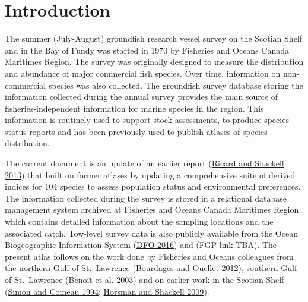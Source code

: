 \documentclass[12pt]{article}\usepackage[]{graphicx}\usepackage[]{color}
\begin{document}

\frontmatter


\renewcommand{\headrulewidth}{0.5pt}  %
\renewcommand{\footrulewidth}{0.5pt}  %

\newcommand{\lt}{\ensuremath <}
\newcommand{\gt}{\ensuremath >}

\newlength{\cslhangindent}
\setlength{\cslhangindent}{1.5em}
\newenvironment{cslreferences}%
  {}%
  {\par}

\hypertarget{sec:introduction}{%
\section{Introduction}\label{sec:introduction}}

The summer (July-August) groundfish research vessel survey on the Scotian Shelf and in the Bay of Fundy was started in 1970 by Fisheries and Oceans Canada Maritimes Region. The survey was originally designed to measure the distribution and abundance of major commercial fish species. Over time, information on non-commercial species was also collected. The groundfish survey database storing the information collected during the annual survey provides the main source of fisheries-independent information for marine species in the region. This information is routinely used to support stock assessments, to produce species status reports and has been previously used to publish atlases of species distribution.

The current document is an update of an earlier report (\protect\hyperlink{ref-Ricard:MARatlas:2013}{Ricard and Shackell 2013}) that built on former atlases by updating a comprehensive suite of derived indices for 104 species to assess population status and environmental preferences. The information collected during the survey is stored in a relational database management system archived at Fisheries and Oceans Canada Maritimes Region which contains detailed information about the sampling locations and the associated catch. Tow-level survey data is also publicly available from the Ocean Biogeographic Information System (\protect\hyperlink{ref-DFO:2016}{DFO 2016}) and (FGP link TBA). The present atlas follows on the work done by Fisheries and Oceans colleagues from the northern Gulf of St.~Lawrence (\protect\hyperlink{ref-Bourdages:NGatlas:2012}{Bourdages and Ouellet 2012}), southern Gulf of St.~Lawrence (\protect\hyperlink{ref-Benoit:etal:2003:techreport}{Benoît et al. 2003}) and on earlier work in the Scotian Shelf (\protect\hyperlink{ref-Simon:Comeau:1994}{Simon and Comeau 1994}; \protect\hyperlink{ref-Horsman:atlas:2009}{Horsman and Shackell 2009}).
\end{document}
